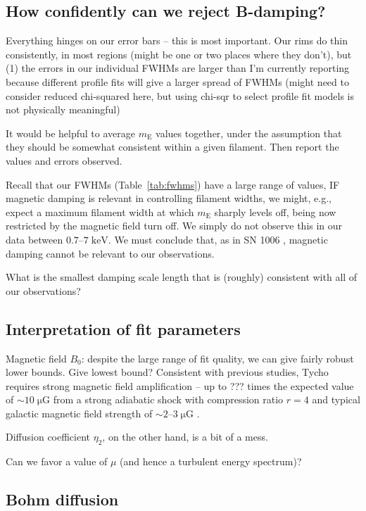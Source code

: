\documentclass[iop, apj, numberedappendix, twocolappendix]{emulateapj}
\newcommand*{\mt}{\mathrm}
\newcommand*{\unit}[1]{\;\mt{#1}}  %
\newcommand*{\abt}{\mathord{\sim}} %
\newcommand*{\mE}{m_\mathrm{E}}
\begin{document}
\subsection{How confidently can we reject B-damping?}

Everything hinges on our error bars -- this is most important.  Our rims do
thin consistently, in most regions (might be one or two places where they
don't), but (1) the errors in our individual FWHMs are larger than I'm
currently reporting because different profile fits will give a larger spread of
FWHMs (might need to consider reduced chi-squared here, but using chi-sqr to
select profile fit models is not physically meaningful)

It would be helpful to average $\mE$ values together, under the
assumption that they should be somewhat consistent within a given filament.
Then report the values and errors observed.

Recall that our FWHMs (Table~\ref{tab:fwhms}) have a large range of values,
IF magnetic damping is relevant in controlling filament widths, we might, e.g.,
expect a maximum filament width at which $\mE$ sharply levels off, being now
restricted by the magnetic field turn off.  We simply do not observe this in
our data between $0.7$--$7 \unit{keV}$.  We must conclude that, as in SN 1006
, magnetic damping cannot be relevant to our
observations.

What is the smallest damping scale length that is (roughly) consistent with all
of our observations?

\subsection{Interpretation of fit parameters}

Magnetic field $B_0$: despite the large range of fit quality, we can give
fairly robust lower bounds.  Give lowest bound?  Consistent with previous
studies, Tycho requires strong magnetic field amplification -- up to ??? times
the expected value of $\abt 10 \unit{\mu G}$ from a strong adiabatic shock with
compression ratio $r=4$ and typical galactic magnetic field strength of $\abt
2$--$3 \unit{\mu G}$ \citep{lyne1989, han2006}.

Diffusion coefficient $\eta_2$, on the other hand, is a bit of a mess.

Can we favor a value of $\mu$ (and hence a turbulent energy spectrum)?

\subsection{Bohm diffusion}
\end{document}
